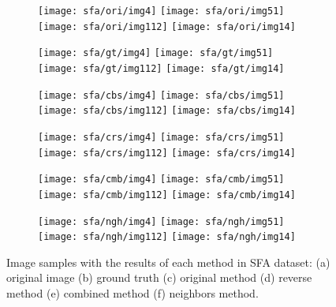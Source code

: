 \begin{figure}[!htb]
    \centering
    \begin{subfigure}[t]{0.15\textwidth}
        \texttt{[image: sfa/ori/img4]}
        \texttt{[image: sfa/ori/img51]}
        \texttt{[image: sfa/ori/img112]}
        \texttt{[image: sfa/ori/img14]}
        \caption{}
    \end{subfigure}
    \begin{subfigure}[t]{0.15\textwidth}
        \texttt{[image: sfa/gt/img4]}
        \texttt{[image: sfa/gt/img51]}
        \texttt{[image: sfa/gt/img112]}
        \texttt{[image: sfa/gt/img14]}
        \caption{}
    \end{subfigure}
    \begin{subfigure}[t]{0.15\textwidth}
        \texttt{[image: sfa/cbs/img4]}
        \texttt{[image: sfa/cbs/img51]}
        \texttt{[image: sfa/cbs/img112]}
        \texttt{[image: sfa/cbs/img14]}
        \caption{}
    \end{subfigure}
    \begin{subfigure}[t]{0.15\textwidth}
        \texttt{[image: sfa/crs/img4]}
        \texttt{[image: sfa/crs/img51]}
        \texttt{[image: sfa/crs/img112]}
        \texttt{[image: sfa/crs/img14]}
        \caption{}
    \end{subfigure}
    \begin{subfigure}[t]{0.15\textwidth}
        \texttt{[image: sfa/cmb/img4]}
        \texttt{[image: sfa/cmb/img51]}
        \texttt{[image: sfa/cmb/img112]}
        \texttt{[image: sfa/cmb/img14]}
        \caption{}
    \end{subfigure}
    \begin{subfigure}[t]{0.15\textwidth}
        \texttt{[image: sfa/ngh/img4]}
        \texttt{[image: sfa/ngh/img51]}
        \texttt{[image: sfa/ngh/img112]}
        \texttt{[image: sfa/ngh/img14]}
        \caption{}
    \end{subfigure}

    \caption[Image samples with the results of each method in SFA dataset]{Image samples with the results of each method in SFA dataset: (a) original image (b) ground truth (c) original method \cite{brancati:17} (d) reverse method (e) combined method (f) neighbors method.}
    \label{fig:results_sfa}
\end{figure}

